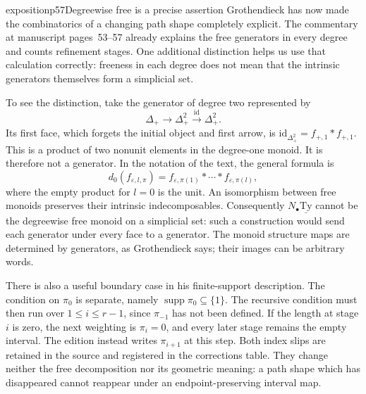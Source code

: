 \begin{dcomment}{exposition}{p57}{Degreewise free is a precise assertion}
Grothendieck has now made the combinatorics of a changing path shape completely explicit. The commentary at manuscript pages~53--57 already explains the free generators in every degree and counts refinement stages. One additional distinction helps us use that calculation correctly: freeness in each degree does not mean that the intrinsic generators themselves form a simplicial set.

To see the distinction, take the generator of degree two represented by
\[
 \Delta_+\longrightarrow\Delta_+^2
       \xrightarrow{\mathrm{id}}\Delta_+^2.
\]
Its first face, which forgets the initial object and first arrow, is
$\mathrm{id}_{\Delta_+^2}=f_{+,1}*f_{+,1}$. This is a product of two nonunit elements in the degree-one monoid. It is therefore not a generator. In the notation of the text, the general formula is
\[
 d_0(f_{\varepsilon,l,\pi})
    =f_{\varepsilon,\pi(1)}*\cdots*f_{\varepsilon,\pi(l)},
\]
where the empty product for $l=0$ is the unit. An isomorphism between free monoids preserves their intrinsic indecomposables. Consequently $N_\bullet\underline{\mathrm{Ty}}$ cannot be the degreewise free monoid on a simplicial set: such a construction would send each generator under every face to a generator. The monoid structure maps are determined by generators, as Grothendieck says; their images can be arbitrary words.

There is also a useful boundary case in his finite-support description. The condition on $\pi_0$ is separate, namely $\operatorname{supp}\pi_0\subseteq\{1\}$. The recursive condition must then run over $1\leq i\leq r-1$, since $\pi_{-1}$ has not been defined. If the length at stage $i$ is zero, the next weighting is $\pi_i=0$, and every later stage remains the empty interval. The edition instead writes $\pi_{i+1}$ at this step. Both index slips are retained in the source and registered in the corrections table. They change neither the free decomposition nor its geometric meaning: a path shape which has disappeared cannot reappear under an endpoint-preserving interval map.
\end{dcomment}

